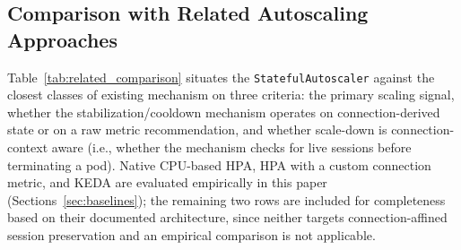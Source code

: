 \documentclass[3p,twocolumn]{elsarticle}
\theoremstyle{plain}%
\theoremstyle{definition}%
\begin{document}
\subsection{Comparison with Related Autoscaling Approaches}
\label{sec:related_comparison}

Table~\ref{tab:related_comparison} situates the \texttt{StatefulAutoscaler} against the closest classes of existing mechanism on three criteria: the primary scaling signal, whether the stabilization/cooldown mechanism operates on connection-derived state or on a raw metric recommendation, and whether scale-down is connection-context aware (i.e., whether the mechanism checks for live sessions before terminating a pod). Native CPU-based HPA, HPA with a custom connection metric, and KEDA are evaluated empirically in this paper (Sections~\ref{sec:baselines}); the remaining two rows are included for completeness based on their documented architecture, since neither targets connection-affined session preservation and an empirical comparison is not applicable.
\end{document}
